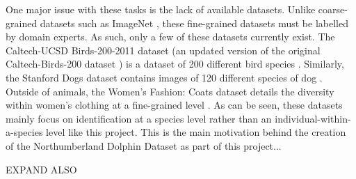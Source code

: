 One major issue with these tasks is the lack of available datasets. Unlike coarse-grained datasets such as ImageNet \cite{deng_imagenet:_2009}, these fine-grained datasets must be labelled by domain experts. As such, only a few of these datasets currently exist. The Caltech-UCSD Birds-200-2011 dataset (an updated version of the original Caltech-Birds-200 dataset \cite{welinder_caltech-ucsd_2010}) is a dataset of 200 different bird species \cite{wah_caltech-ucsd_2011}. Similarly, the Stanford Dogs dataset contains images of 120 different species of dog \cite{khosla_novel_2011}. Outside of animals, the Women's Fashion: Coats dataset details the diversity within women's clothing at a fine-grained level \cite{di_style_2013}. As can be seen, these datasets mainly focus on identification at a species level rather than an individual-within-a-species level like this project. This is the main motivation behind the creation of the Northumberland Dolphin Dataset as part of this project...

EXPAND ALSO 

